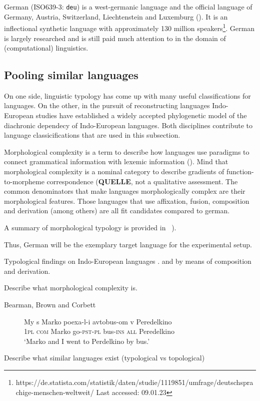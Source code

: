 German (ISO639-3: \texttt{deu}) is a west-germanic language and the official language of Germany, Austria, Switzerland, Liechtenstein and Luxemburg (\cite{METZLER2016}).
It is an inflectional synthetic language with approximately 130 million speakers\footnote{https://de.statista.com/statistik/daten/studie/1119851/umfrage/deutschsprachige-menschen-weltweit/ Last accessed: 09.01.23}.
German is largely researched and is still paid much attention to in the domain of (computational) linguistics.


\subsection{Pooling similar languages}
\label{subsec:german-as-example}



On one side, linguistic typology has come up with many useful classifications for languages.
On the other, in the pursuit of reconstructing languages Indo-European studies have established a widely accepted phylogenetic model of the diachronic dependecy of Indo-European languages.
Both disciplines contribute to language classicifications that are used in this subsection.

Morphological complexity is a term to describe how languages use paradigms to connect grammatical information with lexemic information (\cite{MORPHOLOGICALCOMPLEXITY}).
Mind that morphological complexity is a nominal category to describe gradients of function-to-morpheme correspondence (\textbf{QUELLE}, not a qualitative assessment.
The common denominators that make languages morphologically complex are their morphological features.
Those languages that use affixation, fusion, composition and derivation (among others) are all fit candidates compared to german.

A summary of morphological typology is provided in ~\cite*[78--93]{LINGUISTICTYPOLOGY}).


Thus, German will be the exemplary target language for the experimental setup.

Typological findings on Indo-European languages .
and by means of composition and derivation.





Describe what morphological complexity is.

Bearman, Brown and Corbett


\begin{figure}
    \label{fig:glossing}
    \begin{exe}
        \ex
        \gll  My s Marko poexa-l-i avtobus-om v Peredelkino \\
        1\textsc{pl} \textsc{com} Marko go-\textsc{pst}-\textsc{pl} bus-\textsc{ins} \textsc{all} Peredelkino \\
        \glt  `Marko and I went to Perdelkino by bus.'
    \end{exe}
\end{figure}



Describe what similar languages exist (typological vs topological)

